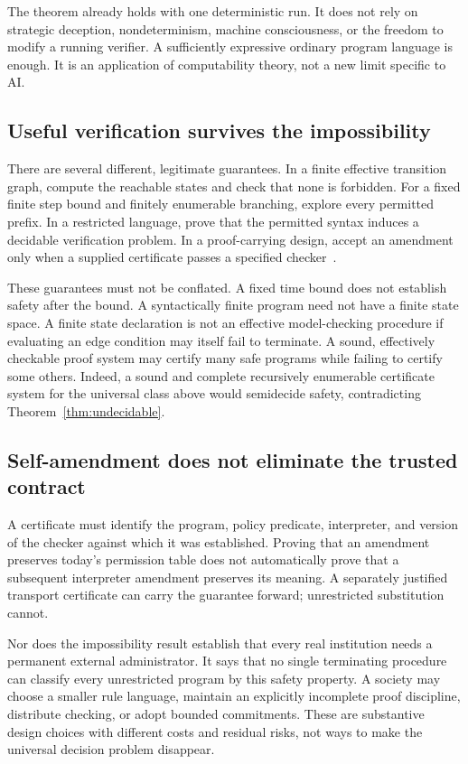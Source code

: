 \documentclass[11pt,letterpaper]{article}
\theoremstyle{plain}
\theoremstyle{definition}
\theoremstyle{remark}
\begin{document}
The theorem already holds with one deterministic run. It does not rely on strategic deception, nondeterminism, machine consciousness, or the freedom to modify a running verifier. A sufficiently expressive ordinary program language is enough. It is an application of computability theory, not a new limit specific to AI.

\subsection{Useful verification survives the impossibility}
There are several different, legitimate guarantees. In a finite effective transition graph, compute the reachable states and check that none is forbidden. For a fixed finite step bound and finitely enumerable branching, explore every permitted prefix. In a restricted language, prove that the permitted syntax induces a decidable verification problem. In a proof-carrying design, accept an amendment only when a supplied certificate passes a specified checker~\cite{necula}.

These guarantees must not be conflated. A fixed time bound does not establish safety after the bound. A syntactically finite program need not have a finite state space. A finite state declaration is not an effective model-checking procedure if evaluating an edge condition may itself fail to terminate. A sound, effectively checkable proof system may certify many safe programs while failing to certify some others. Indeed, a sound and complete recursively enumerable certificate system for the universal class above would semidecide safety, contradicting Theorem~\ref{thm:undecidable}.

\subsection{Self-amendment does not eliminate the trusted contract}
A certificate must identify the program, policy predicate, interpreter, and version of the checker against which it was established. Proving that an amendment preserves today's permission table does not automatically prove that a subsequent interpreter amendment preserves its meaning. A separately justified transport certificate can carry the guarantee forward; unrestricted substitution cannot.

Nor does the impossibility result establish that every real institution needs a permanent external administrator. It says that no single terminating procedure can classify every unrestricted program by this safety property. A society may choose a smaller rule language, maintain an explicitly incomplete proof discipline, distribute checking, or adopt bounded commitments. These are substantive design choices with different costs and residual risks, not ways to make the universal decision problem disappear.
\end{document}

